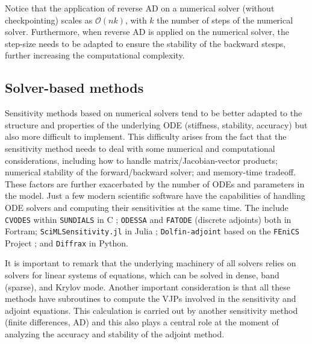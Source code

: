 
Notice that the application of reverse AD on a numerical solver (without checkpointing) scales as $\mathcal O (n k)$, with $k$ the number of steps of the numerical solver. 
Furthermore, when reverse AD is applied on the numerical solver, the step-size needs to be adapted to ensure the stability of the backward stesps, further increasing the computational complexity. 

\subsection{Solver-based methods}

Sensitivity methods based on numerical solvers tend to be better adapted to the structure and properties of the underlying ODE (stiffness, stability, accuracy) but also more difficult to implement.  
This difficulty arises from the fact that the sensitivity method needs to deal with some numerical and computational considerations, including how to handle matrix/Jacobian-vector products; numerical stability of the forward/backward solver; and memory-time tradeoff. 
These factors are further exacerbated by the number of ODEs and parameters in the model. 
Just a few modern scientific software have the capabilities of handling ODE solvers and computing their sensitivities at the same time. 
The include \texttt{CVODES} within \texttt{SUNDIALS} in C \cite{serban2005cvodes, SUNDIALS-hindmarsh2005sundials}; \texttt{ODESSA} \cite{ODESSA} and \texttt{FATODE} (discrete adjoints) \cite{FATODE2014} both in Fortram; \texttt{SciMLSensitivity.jl} in Julia \cite{rackauckas2020universal}; \texttt{Dolfin-adjoint} based on the \texttt{FEniCS} Project \cite{dolfin2013, dolfin2018}; and \texttt{Diffrax} \cite{kidger2021on} in Python. 

It is important to remark that the underlying machinery of all solvers relies on solvers for linear systems of equations, which can be solved in dense, band (sparse), and Krylov mode. 
Another important consideration is that all these methods have subroutines to compute the VJPs involved in the sensitivity and adjoint equations. 
This calculation is carried out by another sensitivity method (finite differences, AD) and this also plays a central role at the moment of analyzing the accuracy and stability of the adjoint method. 

